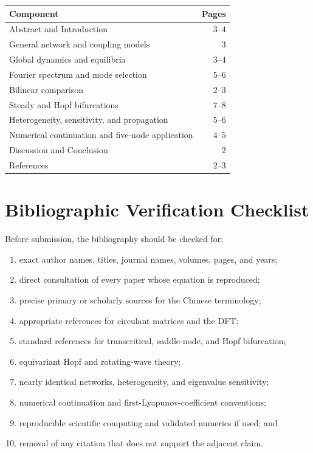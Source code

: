 \documentclass[11pt, reqno]{amsart}
\theoremstyle{definition}
\theoremstyle{remark}
\begin{document}
	\begin{center}
		\begin{tabular}{p{8.5cm}r}
			\toprule
			Component & Pages \\
			\midrule
			Abstract and Introduction & $3$--$4$ \\
			General network and coupling models & $3$ \\
			Global dynamics and equilibria & $3$--$4$ \\
			Fourier spectrum and mode selection & $5$--$6$ \\
			Bilinear comparison & $2$--$3$ \\
			Steady and Hopf bifurcations & $7$--$8$ \\
			Heterogeneity, sensitivity, and propagation & $5$--$6$ \\
			Numerical continuation and five-node application & $4$--$5$ \\
			Discussion and Conclusion & $2$ \\
			References & $2$--$3$ \\
			\bottomrule
		\end{tabular}
	\end{center}
	
	\section{Bibliographic Verification Checklist}
	\label{app:bibliography-checklist}
	
	Before submission, the bibliography should be checked for:
	\begin{enumerate}[label=(\arabic*),leftmargin=2.5em]
		\item exact author names, titles, journal names, volumes, pages, and years;
		\item direct consultation of every paper whose equation is reproduced;
		\item precise primary or scholarly sources for the Chinese terminology;
		\item appropriate references for circulant matrices and the DFT;
		\item standard references for transcritical, saddle-node, and Hopf
		bifurcation;
		\item equivariant Hopf and rotating-wave theory;
		\item nearly identical networks, heterogeneity, and eigenvalue sensitivity;
		\item numerical continuation and first-Lyapunov-coefficient conventions;
		\item reproducible scientific computing and validated numerics if used; and
		\item removal of any citation that does not support the adjacent claim.
	\end{enumerate}
	
\end{document}

